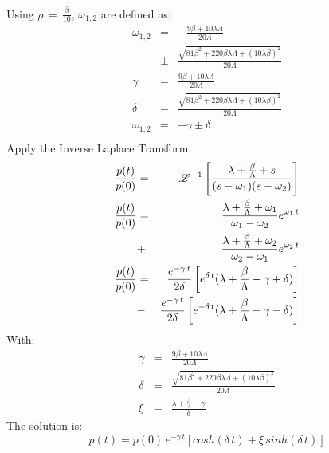 \begin{questions}
{\begin{parts}
{{\begin{solution}
\begin{multicols}{2}
\begin{eqnarray*}
\end{eqnarray*}
Using $\displaystyle\rho\, =\,\frac{\beta}{10}$, $\omega_{1,2}$ are defined as:
\begin{eqnarray*}
\omega_{1,2} & = & -\frac{9\beta+10\lambda\Lambda}{20\Lambda}\\
& \pm & \frac{\sqrt{81\beta^2+220\beta\lambda\Lambda+(10\lambda\beta)^2}}{20\Lambda}\\
\gamma & = &\frac{9\beta+10\lambda\Lambda}{20\Lambda}\\
\delta & = & \frac{\sqrt{81\beta^2+220\beta\lambda\Lambda+(10\lambda\beta)^2}}{20\Lambda}\\
\omega_{1,2} & = & -\gamma \pm \delta\\
\end{eqnarray*}
Apply the Inverse Laplace Transform.
\begin{eqnarray*}
\frac{p(t)}{p(0)} & = & \mathscr{L}^{-1}\left[\frac{\lambda+\frac{\beta}{\Lambda}+s}{(s-\omega_1)(s-\omega_2)}\right]\\
\frac{p(t)}{p(0)} & = & \frac{\lambda+\frac{\beta}{\Lambda}+\omega_1}{\omega_1-\omega_2}e^{\omega_1\,t}\\
&+&\frac{\lambda+\frac{\beta}{\Lambda}+\omega_2}{\omega_2-\omega_1}e^{\omega_2\,t}\\
\frac{p(t)}{p(0)} & = & \frac{e^{-\gamma\,t}}{2\delta}\left[e^{\delta\,t}(\lambda+\frac{\beta}{\Lambda}-\gamma+\delta)\right]\\
&-&\frac{e^{-\gamma\,t}}{2\delta}\left[e^{-\delta\,t}(\lambda+\frac{\beta}{\Lambda}-\gamma-\delta)\right]\\
\end{eqnarray*}
With:
\begin{eqnarray*}
\gamma & = &\frac{9\beta+10\lambda\Lambda}{20\Lambda}\\
\delta & = & \frac{\sqrt{81\beta^2+220\beta\lambda\Lambda+(10\lambda\beta)^2}}{20\Lambda}\\
\xi & = & \frac{\lambda+\frac{\beta}{\Lambda}-\gamma}{\delta}
\end{eqnarray*}
The solution is:
$$\displaystyle p(t) = p(0)\,e^{-\gamma\,t}\left[cosh(\delta\,t)+\xi\,sinh(\delta\,t)\right]$$
\end{multicols}
\vfill
\end{solution}}
}
\end{parts}}
\end{questions}
\pagebreak
